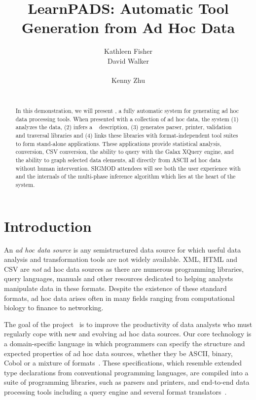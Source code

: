 \documentclass[preprint]{sig-alternate-sigmod08}
\title{LearnPADS: Automatic Tool Generation from Ad Hoc Data}
\author{\alignauthor Kathleen Fisher \\
\affaddr{AT\&T Labs Research}
\email{kfisher@research.att.com}
\alignauthor David Walker \\
\affaddr{Princeton University}\\
\email{dpw@cs.princeton.edu}
\alignauthor Kenny Zhu \\
\affaddr{Princeton University}\\
\email{kzhu@cs.princeton.edu}
}
\begin{document}
\maketitle
\begin{abstract}
In this demonstration, we will present \learnpads, 
a fully automatic system for generating
ad hoc data processing tools.  When presented with a collection of
ad hoc data, the system (1) analyzes the data, (2) infers a 
\pads{}~\cite{fisher+:pads,fisher+:popl06} description, (3) 
generates parser, printer, validation and traversal libraries and (4)
links these libraries with format-independent  
tool suites to form stand-alone applications.  These applications provide
statistical analysis, \xml{}
conversion, CSV conversion, the ability to query with the 
Galax XQuery engine, and the ability to graph selected data elements, all
directly from ASCII ad hoc data without human intervention.
SIGMOD attendees will see both the user experience with \learnpads{} and
the internals of the multi-phase inference algorithm which lies at
the heart of the system. 
\end{abstract}

\section{Introduction}
An {\em ad hoc data source} is any semistructured data source
for which useful data analysis and transformation tools
are not widely available. XML, HTML and CSV are {\em not} 
ad hoc data sources as there are numerous programming libraries,
query languages, manuals and other resources dedicated to
helping analysts manipulate data in these formats.
Despite the existence of these standard formats, ad hoc data arises
often in many fields ranging from computational biology to finance to networking.

The goal of the \pads{} project~\cite{padsweb} is to improve the
productivity of data analysts who must regularly cope with new and evolving
ad hoc data sources.  Our core technology is a
domain-specific language in which programmers can specify the
structure and expected properties of ad hoc data sources, whether they
be ASCII, binary, Cobol or a mixture of formats~\cite{fisher+:pads,fisher+:popl06}.  These
specifications, which resemble extended type declarations from
conventional programming languages, are compiled into a suite of
programming libraries, such as parsers and printers, and 
end-to-end data processing tools including a query engine 
and several format translators~\cite{fernandez+:padl,fernandez+:padx,mandelbaum+:pads-ml}.
\end{document}
